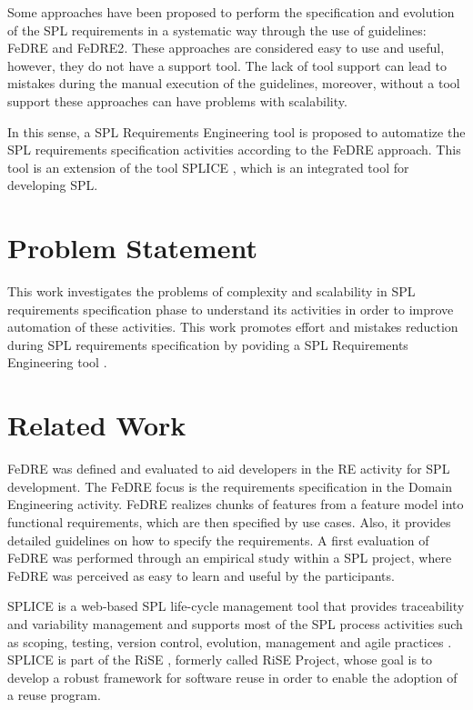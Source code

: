 Some approaches have been proposed to perform the specification and evolution of
the \ac{SPL} requirements in a systematic way through the use of guidelines: 
\acf{FeDRE} and \acf{FeDRE2}.
These approaches are considered easy to use and useful, however, they do not have a support tool. 
The lack of tool support can lead to mistakes during the manual execution of the guidelines, moreover, 
without a tool support these approaches can have problems with scalability.

In this sense, a \ac{SPL} Requirements Engineering tool is proposed to automatize the
\ac{SPL} requirements specification activities according to the \ac{FeDRE} approach. This tool is 
an extension of the tool \ac{SPLICE} \citep{splice2014cbsof}, which is an
integrated tool for developing \ac{SPL}.

\section{Problem Statement}
\label{sc:problem}

This work investigates the problems of complexity and scalability in \ac{SPL}
requirements specification phase to understand its activities in order to improve 
automation of these activities. This work promotes effort and mistakes reduction during 
\ac{SPL} requirements specification by poviding a \ac{SPL} Requirements Engineering tool .   

\section{Related Work}
\label{sc:related}
\acf{FeDRE} \citep{de2014defining} was 
defined and evaluated to aid developers in the \acf{RE} activity for \ac{SPL} 
development. The \ac{FeDRE} focus is the requirements specification in the Domain Engineering activity. 
\ac{FeDRE} realizes chunks of features from a feature model into functional requirements, which are then 
specified by use cases. Also, it provides detailed guidelines on how to specify the requirements.  
A first evaluation of \ac{FeDRE} was performed through an empirical study within a \ac{SPL} project, where \ac{FeDRE} 
was perceived as easy to learn and useful by the participants.

\acf{SPLICE} is a web-based \ac{SPL} life-cycle 
management tool that provides traceability and variability management and supports most of the \ac{SPL} process 
activities such as scoping, testing, version control, evolution, management and
agile practices \citep{vale2014splice}. \ac{SPLICE} is part of the \acf{RiSE}
\citep{Almeida2004}, formerly called \ac{RiSE} Project, whose goal is to develop a robust framework for software reuse in order to enable the adoption of a 
reuse program. 

